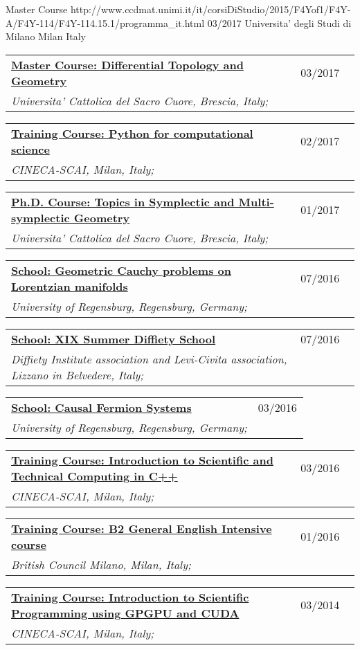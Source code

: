 \documentclass[a4paper]{article}
\newcommand{\longvoice}[8]{
	\begin{tabular}{p{0.83\linewidth} p{0.17\linewidth} }
		\textbf{\href{#3}{#2: #1}} & #4 
		\\ 
		\textit{#5, #6, #7;} & {\small\emph{#8}}
	\end{tabular}
	\vspace{.5em}
}
\begin{document}
		{Master Course}
		{http://www.ccdmat.unimi.it/it/corsiDiStudio/2015/F4Yof1/F4Y-A/F4Y-114/F4Y-114.15.1/programma_it.html}
		{03/2017}
		{Universita' degli Studi di Milano}
		{Milan}
		{Italy}
		{}
	\longvoice{Differential Topology and Geometry}
		{Master Course}
		{http://docenti.unicatt.it/web/html/index.html\#/programmi/BS/2D8B/75017/2017/21065/MGH344/ita}
		{03/2017}
		{Universita' Cattolica del Sacro Cuore}
		{Brescia}
		{Italy}
		{}
	\longvoice{Python for computational science}
		{Training Course}
		{https://web.archive.org/web/20170623170252/https://eventi.cineca.it/en/hpc/python-computational-science}
		{02/2017}
		{CINECA-SCAI}
		{Milan}
		{Italy}
		{}
	\longvoice{Topics in Symplectic and Multi-symplectic Geometry}
		{Ph.D. Course}
		{https://web.archive.org/save/http://scuoledidottorato.unicatt.it/phdschools/science-10545.html}
		{01/2017}
		{Universita' Cattolica del Sacro Cuore}
		{Brescia}
		{Italy}
		{}
	\longvoice{Geometric Cauchy problems on Lorentzian manifolds}
		{School}
		{https://web.archive.org/web/20170623170457/http://www-app.uni-regensburg.de/Fakultaeten/MAT/GK/index.php/Summer_School_2016}
		{07/2016}
		{University of Regensburg}
		{Regensburg}
		{Germany}
		{}
	\longvoice{XIX Summer Diffiety School}
		{School}
		{https://web.archive.org/web/20170623170547/https://sites.google.com/site/levicivitainstitute//Activities/DiffietySchools/xix-summer-diffiety-school}
		{07/2016}
		{Diffiety Institute association and Levi-Civita association}
		{Lizzano in Belvedere}
		{Italy}
		{}
	\longvoice{Causal Fermion Systems}
		{School}
		{https://web.archive.org/web/20170623170718/http://www.uni-regensburg.de/mathematics/causal-fermion-systems/}
		{03/2016}
		{University of Regensburg}
		{Regensburg}
		{Germany}
		{}
	\longvoice{Introduction to Scientific and Technical Computing in C++}
		{Training Course}
		{https://web.archive.org/save/http://www.hpc.cineca.it/content/introduction-object-oriented}
		{03/2016}
		{CINECA-SCAI}
		{Milan}
		{Italy}
		{}
	\longvoice{B2 General English Intensive course}
		{Training Course}
		{https://www.britishcouncil.it/en/english/courses-adults/general}
		{01/2016}
		{British Council Milano}
		{Milan}
		{Italy}
		{}
	\longvoice{Introduction to Scientific Programming using GPGPU and CUDA}
		{Training Course}
		{https://web.archive.org/web/20170623171128/http://www.hpc.cineca.it/content/introduction-to-gpu}
		{03/2014}
		{CINECA-SCAI}
		{Milan}
		{Italy}
		{}
\end{document}
